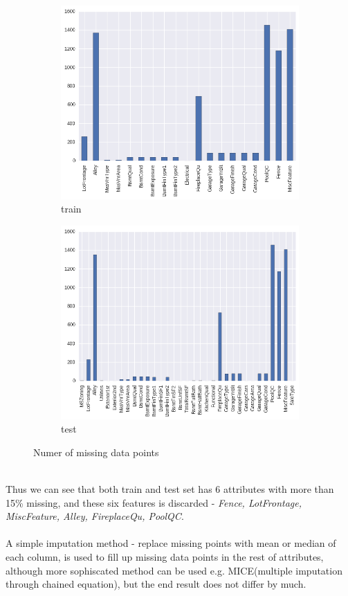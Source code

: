 \documentclass[12pt]{article}
\begin{document}
\begin{figure}
	\centering
	\begin{subfigure}{.5\textwidth}
		\centering
		\includegraphics[width=\linewidth]{train_miss.png}
		\caption{train}
		\label{fig:sub1}
	\end{subfigure}%
	\begin{subfigure}{.5\textwidth}
		\centering
		\includegraphics[width=\linewidth]{test_miss.png}
		\caption{test}
		\label{fig:sub2}
	\end{subfigure}
	\caption{Numer of missing data points}
\end{figure}\\
Thus we can see that both train and test set has 6 attributes with more than 15\% missing, and these six features is discarded - \textit{Fence, LotFrontage, MiscFeature, Alley, FireplaceQu, PoolQC}.\\
\\
A simple imputation method - replace missing points with mean or median of each column,  is used to fill up missing data points in the rest of attributes, although more sophiscated method can be used e.g. MICE(multiple imputation through chained equation), but the end result does not differ by much.
\end{document}
